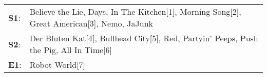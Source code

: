 \begin{supertabular}{p{0.03\textwidth}p{0.92\textwidth}}
 \textbf{S1}:  &  Believe the Lie\textsuperscript{},  Days\textsuperscript{}, \enspace In The Kitchen[1]\textsuperscript{}, \enspace Morning Song[2]\textsuperscript{}, \enspace Great American[3]\textsuperscript{}, \enspace Nemo\textsuperscript{}, \enspace JaJunk\textsuperscript{}  \enspace  \\
 \textbf{S2}:  &                                    Der Bluten Kat[4]\textsuperscript{}, \enspace Bullhead City[5]\textsuperscript{}, \enspace Red\textsuperscript{}, \enspace Partyin' Peeps\textsuperscript{}, \enspace Push the Pig\textsuperscript{}, \enspace All In Time[6]\textsuperscript{}  \enspace  \\
 \textbf{E1}:  &                                                                                                                                                                                                                                                   Robot World[7]\textsuperscript{}  \enspace  \\
\end{supertabular}
